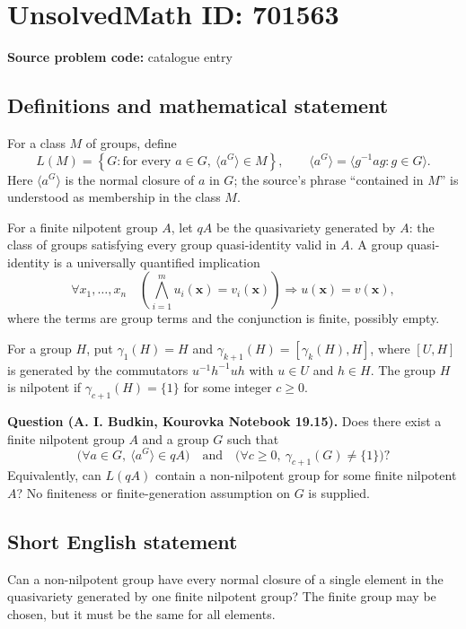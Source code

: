 \documentclass[11pt]{article}
\begin{document}
\section*{UnsolvedMath ID: 701563}
\textbf{Source problem code:} catalogue entry
\subsection{Definitions and mathematical statement}
For a class \(M\) of groups, define
\[
L(M)=\left\{G:\text{for every }a\in G,\ \langle a^G\rangle\in M\right\},
\qquad
\langle a^G\rangle=\langle g^{-1}ag:g\in G\rangle.
\]
Here \(\langle a^G\rangle\) is the normal closure of \(a\) in \(G\); the source's phrase ``contained in \(M\)'' is understood as membership in the class \(M\).

For a finite nilpotent group \(A\), let \(qA\) be the quasivariety generated by \(A\): the class of groups satisfying every group quasi-identity valid in \(A\). A group quasi-identity is a universally quantified implication
\[
\forall x_1,\ldots,x_n\quad
\left(\bigwedge_{i=1}^{m}u_i(\mathbf{x})=v_i(\mathbf{x})\right)
\Longrightarrow u(\mathbf{x})=v(\mathbf{x}),
\]
where the terms are group terms and the conjunction is finite, possibly empty.

For a group \(H\), put \(\gamma_1(H)=H\) and \(\gamma_{k+1}(H)=[\gamma_k(H),H]\), where \([U,H]\) is generated by the commutators \(u^{-1}h^{-1}uh\) with \(u\in U\) and \(h\in H\). The group \(H\) is nilpotent if \(\gamma_{c+1}(H)=\{1\}\) for some integer \(c\geq 0\).

\textbf{Question (A. I. Budkin, Kourovka Notebook 19.15).} Does there exist a finite nilpotent group \(A\) and a group \(G\) such that
\[
\bigl(\forall a\in G,\ \langle a^G\rangle\in qA\bigr)
\quad\text{and}\quad
\bigl(\forall c\geq 0,\ \gamma_{c+1}(G)\neq\{1\}\bigr)?
\]
Equivalently, can \(L(qA)\) contain a non-nilpotent group for some finite nilpotent \(A\)? No finiteness or finite-generation assumption on \(G\) is supplied.
\subsection{Short English statement}
Can a non-nilpotent group have every normal closure of a single element in the quasivariety generated by one finite nilpotent group? The finite group may be chosen, but it must be the same for all elements.
\end{document}

